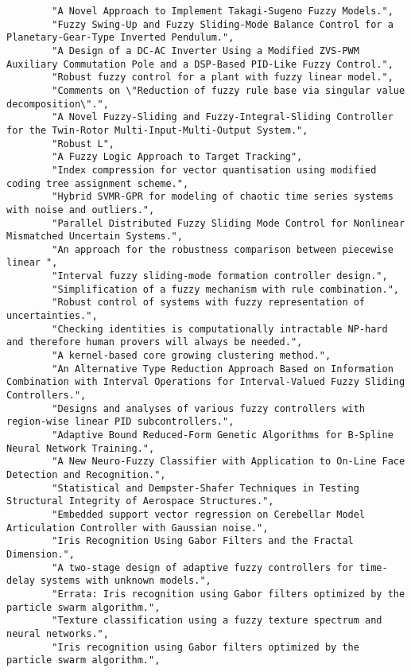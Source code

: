\begin{verbatim}
        "A Novel Approach to Implement Takagi-Sugeno Fuzzy Models.", 
        "Fuzzy Swing-Up and Fuzzy Sliding-Mode Balance Control for a Planetary-Gear-Type Inverted Pendulum.", 
        "A Design of a DC-AC Inverter Using a Modified ZVS-PWM Auxiliary Commutation Pole and a DSP-Based PID-Like Fuzzy Control.", 
        "Robust fuzzy control for a plant with fuzzy linear model.", 
        "Comments on \"Reduction of fuzzy rule base via singular value decomposition\".", 
        "A Novel Fuzzy-Sliding and Fuzzy-Integral-Sliding Controller for the Twin-Rotor Multi-Input-Multi-Output System.", 
        "Robust L", 
        "A Fuzzy Logic Approach to Target Tracking", 
        "Index compression for vector quantisation using modified coding tree assignment scheme.", 
        "Hybrid SVMR-GPR for modeling of chaotic time series systems with noise and outliers.", 
        "Parallel Distributed Fuzzy Sliding Mode Control for Nonlinear Mismatched Uncertain Systems.", 
        "An approach for the robustness comparison between piecewise linear ", 
        "Interval fuzzy sliding-mode formation controller design.", 
        "Simplification of a fuzzy mechanism with rule combination.", 
        "Robust control of systems with fuzzy representation of uncertainties.", 
        "Checking identities is computationally intractable NP-hard and therefore human provers will always be needed.", 
        "A kernel-based core growing clustering method.", 
        "An Alternative Type Reduction Approach Based on Information Combination with Interval Operations for Interval-Valued Fuzzy Sliding Controllers.", 
        "Designs and analyses of various fuzzy controllers with region-wise linear PID subcontrollers.", 
        "Adaptive Bound Reduced-Form Genetic Algorithms for B-Spline Neural Network Training.", 
        "A New Neuro-Fuzzy Classifier with Application to On-Line Face Detection and Recognition.", 
        "Statistical and Dempster-Shafer Techniques in Testing Structural Integrity of Aerospace Structures.", 
        "Embedded support vector regression on Cerebellar Model Articulation Controller with Gaussian noise.", 
        "Iris Recognition Using Gabor Filters and the Fractal Dimension.", 
        "A two-stage design of adaptive fuzzy controllers for time-delay systems with unknown models.", 
        "Errata: Iris recognition using Gabor filters optimized by the particle swarm algorithm.", 
        "Texture classification using a fuzzy texture spectrum and neural networks.", 
        "Iris recognition using Gabor filters optimized by the particle swarm algorithm.", 

\end{verbatim}

